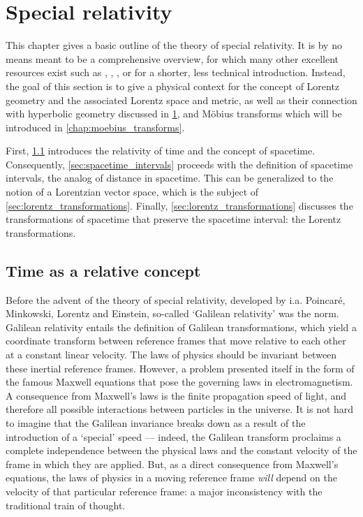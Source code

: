 \chapter{Special relativity}
\label{chap:relativity}
This chapter gives a basic outline of the theory of special relativity. It is by no means meant to be a comprehensive overview, for which many other excellent resources exist such as \citet{Misner1970}, \citet{Taylor1992}, \citet{Landau1971}, or \citet{Penrose1978} for a shorter, less technical introduction. Instead, the goal of this section is to give a physical context for the concept of Lorentz geometry and the associated Lorentz space and metric, as well as their connection with hyperbolic geometry discussed in \cref{chap:relativity}, and Möbius transforms which will be introduced in \cref{chap:moebius_transforms}.

First, \cref{sec:time_relative} introduces the relativity of time and the concept of spacetime. Consequently, \cref{sec:spacetime_intervals} proceeds with the definition of spacetime intervals, the analog of distance in spacetime. This can be generalized to the notion of a Lorentzian vector space, which is the subject of \cref{sec:lorentz_transformations}. Finally, \cref{sec:lorentz_transformations} discusses the transformations of spacetime that preserve the spacetime interval: the Lorentz transformations.

\section{Time as a relative concept}
\label{sec:time_relative}
Before the advent of the theory of special relativity, developed by i.a. Poincaré, Minkowski, Lorentz and Einstein, so-called `Galilean relativity' was the norm. Galilean relativity entails the definition of Galilean transformations, which yield a coordinate transform between reference frames that move relative to each other at a constant linear velocity. The laws of physics should be invariant between these inertial reference frames. However, a problem presented itself in the form of the famous Maxwell equations that pose the governing laws in electromagnetism. A consequence from Maxwell's laws is the finite propagation speed of light, and therefore all possible interactions between particles in the universe. It is not hard to imagine that the Galilean invariance breaks down as a result of the introduction of a `special' speed --- indeed, the Galilean transform proclaims a complete independence between the physical laws and the constant velocity of the frame in which they are applied. But, as a direct consequence from Maxwell's equations, the laws of physics in a moving reference frame \emph{will} depend on the velocity of that particular reference frame: a major inconsistency with the traditional train of thought.

